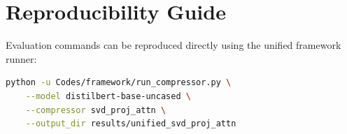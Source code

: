 \section{Reproducibility Guide}
Evaluation commands can be reproduced directly using the unified framework runner:
\begin{lstlisting}[language=bash]
python -u Codes/framework/run_compressor.py \
    --model distilbert-base-uncased \
    --compressor svd_proj_attn \
    --output_dir results/unified_svd_proj_attn
\end{lstlisting}
